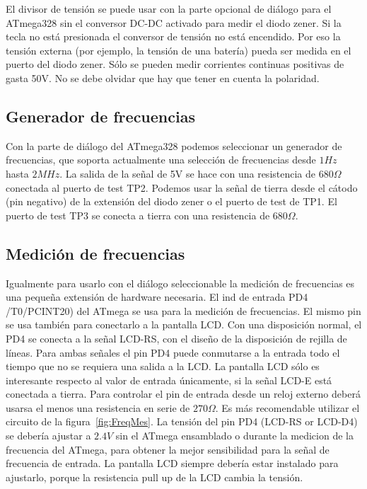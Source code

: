 El divisor de tensión se puede usar con la parte opcional de diálogo para el ATmega328 sin el conversor DC-DC activado
para medir  el diodo zener.  Si la tecla no  está presionada el  conversor de tensión  no está encendido. Por  eso la
tensión externa  (por ejemplo, la tensión  de una batería) pueda  ser medida en el  puerto del diodo zener.  Sólo se
pueden medir corrientes continuas positivas de gasta 50V. No se debe olvidar que hay que tener en cuenta la polaridad.

\subsection{Generador de frecuencias}

Con la  parte de diálogo  del ATmega328 podemos  seleccionar un generador de  frecuencias, que soporta  actualmente una
selección de frecuencias desde  \(1 Hz\) hasta \(2 MHz\). La salida  de la señal de 5V se hace  con una resistencia de
\(680\Omega\) conectada al puerto  de test TP2. Podemos usar la  señal de tierra desde el cátodo  (pin negativo) de la
extensión del diodo zener o el puerto de test de TP1. El  puerto de test TP3 se conecta a tierra con una resistencia de
\(680\Omega\).

\subsection{Medición de frecuencias}

Igualmente para usarlo con el diálogo seleccionable la  medición de frecuencias es una pequeña extensión de hardware
necesaria. El ind de  entrada PD4 /T0/PCINT20) del ATmega se  usa para la medición de frecuencias. El  mismo pin se usa
también para conectarlo a  la pantalla LCD. Con una disposición  normal, el PD4 se conecta a la  señal LCD-RS, con el
diseño de la disposición de  rejilla de líneas. Para ambas señales el pin PD4 puede  conmutarse a la entrada todo el
tiempo que  no se  requiera una salida  a la  LCD. La pantalla  LCD sólo  es interesante respecto  al valor  de entrada
únicamente, si  la señal  LCD-E está conectada  a tierra.  Para controlar el  pin de entrada  desde un  reloj externo
deberá usarsa  el menos una  resistencia en serie  de \(270\Omega\).  Es más recomendable  utilizar el circuito  de la
figura~\ref{fig:FreqMes}. La  tensión del  pin PD4  (LCD-RS or  LCD-D4) se debería  ajustar a  \(2.4V\) sin  el ATmega
ensamblado o  durante la medicion  de la frecuencia  del ATmega, para  obtener la mejor  sensibilidad para la  señal de
frecuencia de entrada. La pantalla LCD siempre debería estar instalado para ajustarlo, porque la resistencia pull up de
la LCD cambia la tensión.

